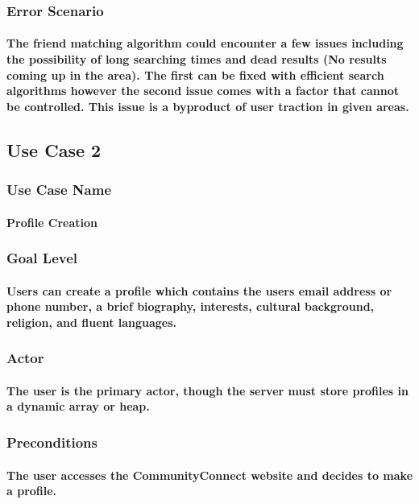 \documentclass[12pt]{article}
\begin{document}
		\subsubsection{Error Scenario}
			\paragraph{\normalfont The friend matching algorithm could encounter a few issues including the possibility of long searching times and dead results (No results coming up in the area). The first can be fixed with efficient search algorithms however the second issue comes with a factor that cannot be controlled. This issue is a byproduct of user traction in given areas.
			}

	\subsection{\bf Use Case 2}
		\subsubsection{Use Case Name}
			\paragraph{\normalfont Profile Creation
			}
		\subsubsection{Goal Level}
			\paragraph{\normalfont Users can create a profile which contains the users email address or phone number, a brief biography, interests, cultural background, religion, and fluent languages.
			}
		\subsubsection{Actor}
			\paragraph{\normalfont The user is the primary actor, though the server must store profiles in a dynamic array or heap.
			}
		\subsubsection{Preconditions}
			\paragraph{\normalfont The user accesses the CommunityConnect website and decides to make a profile.
			}
\end{document}
